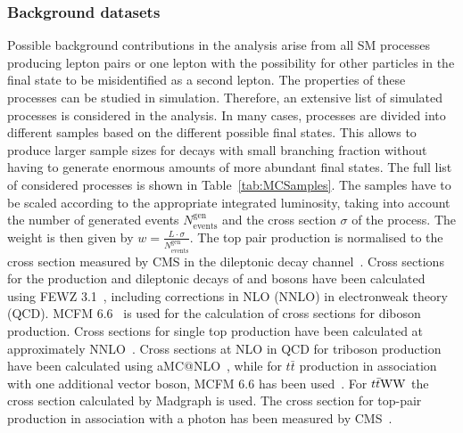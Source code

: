 \subsubsection{Background datasets}
Possible background contributions in the analysis arise from all SM processes producing lepton pairs or one lepton with the possibility for other particles in the final state to be misidentified as a second lepton. The properties of these processes can be studied in simulation. Therefore, an extensive list of simulated processes is considered in the analysis. In many cases, processes are divided into different samples based on the different possible final states. This allows to produce larger sample sizes for decays with small branching fraction without having to generate enormous amounts of more abundant final states. The full list of considered processes is shown in Table~\ref{tab:MCSamples}. The samples have to be scaled according to the appropriate integrated luminosity, taking into account the number of generated events $N_{\text{events}}^{\text{gen}}$ and the cross section $\sigma$ of the process. The weight is then given by $w  = \frac{L\cdot \sigma}{N_{\text{events}}^{\text{gen}}}$. The top pair production is normalised to the cross section measured by CMS in the dileptonic decay channel~\cite{CMS-PAS-TOP-12-007}. Cross sections for the production and dileptonic decays of \W and \Z bosons have been calculated using FEWZ 3.1~\cite{Li:2012wna}, including corrections in NLO (NNLO) in electronweak theory (QCD). MCFM 6.6~\cite{Campbell:2011bn} is used for the calculation of cross sections for diboson production. Cross sections for single top production have been calculated at approximately NNLO~\cite{Kidonakis:2012db}. Cross sections at NLO in QCD for triboson production have been calculated using aMC@NLO~\cite{Madgraph2}, while for $t\bar{t}$ production in association with one additional vector boson, MCFM 6.6 has been used~\cite{Garzelli:2012bn}. For  $t\bar{t}\mathrm{W}\mathrm{W}$ the cross section calculated by Madgraph is used. The cross section for top-pair production in association with a photon has been measured by CMS~\cite{CMS-PAS-TOP-13-011}.  

